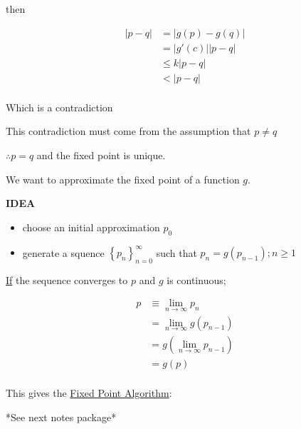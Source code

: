 \documentclass[12pt]{article}
\begin{document}
then 

\begin{align*}
  |p-q| &= |g(p) - g(q)| \\
  &= |g'(c)||p-q| \\
  &\leq k|p-q| \\
  &< |p-q|  \\
\end{align*}

Which is a contradiction

This contradiction must come from the assumption that $p \ne q$

$\therefore p = q$ and the fixed point is unique.

We want to approximate the fixed point of a function $g$.

\textbf{IDEA}

\begin{itemize}
\item choose an initial approximation $p_0$
\item generate a squence $\displaystyle \left\{ p_n \right\}_{n=0}^\infty$
  such that $p_n = g(p_{n-1}); n \geq 1$
\end{itemize}

\uline{If} the sequence converges to $p$ and $g$ is continuous;

\begin{align*}
  p &\equiv \lim_{n\to\infty} p_n \\
  &= \lim_{n\to\infty} g(p_{n-1}) \\
  &=  g(\lim_{n\to\infty} p_{n-1}) \\
  &= g(p) \\
\end{align*}

This gives the \uline{Fixed Point Algorithm}:

*See next notes package*
\end{document}
